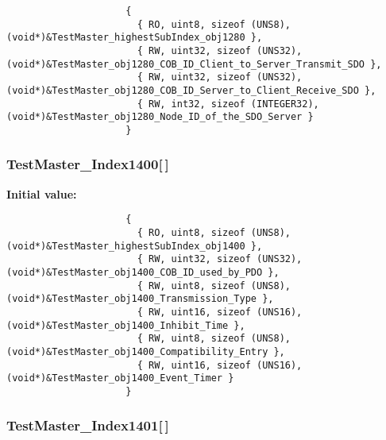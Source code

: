 \begin{Code}\begin{verbatim} 
                     {
                       { RO, uint8, sizeof (UNS8), (void*)&TestMaster_highestSubIndex_obj1280 },
                       { RW, uint32, sizeof (UNS32), (void*)&TestMaster_obj1280_COB_ID_Client_to_Server_Transmit_SDO },
                       { RW, uint32, sizeof (UNS32), (void*)&TestMaster_obj1280_COB_ID_Server_to_Client_Receive_SDO },
                       { RW, int32, sizeof (INTEGER32), (void*)&TestMaster_obj1280_Node_ID_of_the_SDO_Server }
                     }
\end{verbatim}\end{Code}
\subsubsection{ {\bf Test\-Master\_\-Index1400}[$\,$]}\label{TestMasterSlave_2TestMaster_8c_964e58fce023577425f5a5351c894da9}


\textbf{Initial value:}

\begin{Code}\begin{verbatim} 
                     {
                       { RO, uint8, sizeof (UNS8), (void*)&TestMaster_highestSubIndex_obj1400 },
                       { RW, uint32, sizeof (UNS32), (void*)&TestMaster_obj1400_COB_ID_used_by_PDO },
                       { RW, uint8, sizeof (UNS8), (void*)&TestMaster_obj1400_Transmission_Type },
                       { RW, uint16, sizeof (UNS16), (void*)&TestMaster_obj1400_Inhibit_Time },
                       { RW, uint8, sizeof (UNS8), (void*)&TestMaster_obj1400_Compatibility_Entry },
                       { RW, uint16, sizeof (UNS16), (void*)&TestMaster_obj1400_Event_Timer }
                     }
\end{verbatim}\end{Code}
\subsubsection{ {\bf Test\-Master\_\-Index1401}[$\,$]}\label{TestMasterSlave_2TestMaster_8c_c64932048ec6cff121a854815bdc8c4f}


